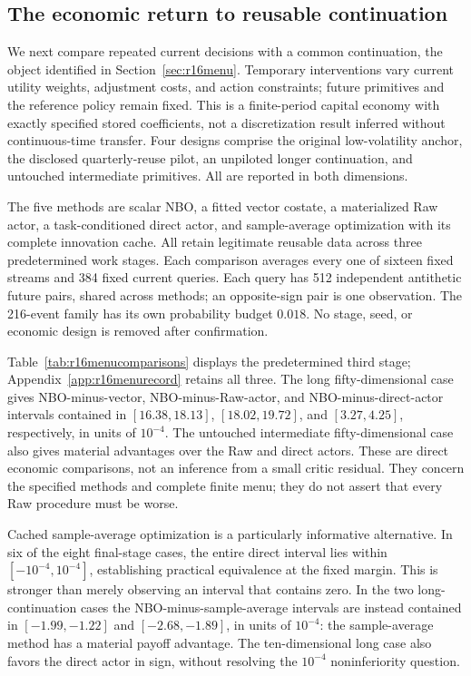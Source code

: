 \subsection{The economic return to reusable continuation}
\label{sec:r16completedmenu}
We next compare repeated current decisions with a common continuation, the object identified in Section~\ref{sec:r16menu}. Temporary interventions vary current utility weights, adjustment costs, and action constraints; future primitives and the reference policy remain fixed. This is a finite-period capital economy with exactly specified stored coefficients, not a discretization result inferred without continuous-time transfer. Four designs comprise the original low-volatility anchor, the disclosed quarterly-reuse pilot, an unpiloted longer continuation, and untouched intermediate primitives. All are reported in both dimensions.

The five methods are scalar NBO, a fitted vector costate, a materialized Raw actor, a task-conditioned direct actor, and sample-average optimization with its complete innovation cache. All retain legitimate reusable data across three predetermined work stages. Each comparison averages every one of sixteen fixed streams and 384 fixed current queries. Each query has 512 independent antithetic future pairs, shared across methods; an opposite-sign pair is one observation. The 216-event family has its own probability budget $0.018$. No stage, seed, or economic design is removed after confirmation.



Table~\ref{tab:r16menucomparisons} displays the predetermined third stage; Appendix~\ref{app:r16menurecord} retains all three. The long fifty-dimensional case gives NBO-minus-vector, NBO-minus-Raw-actor, and NBO-minus-direct-actor intervals contained in $[16.38,18.13]$, $[18.02,19.72]$, and $[3.27,4.25]$, respectively, in units of $10^{-4}$. The untouched intermediate fifty-dimensional case also gives material advantages over the Raw and direct actors. These are direct economic comparisons, not an inference from a small critic residual. They concern the specified methods and complete finite menu; they do not assert that every Raw procedure must be worse.

Cached sample-average optimization is a particularly informative alternative. In six of the eight final-stage cases, the entire direct interval lies within $[-10^{-4},10^{-4}]$, establishing practical equivalence at the fixed margin. This is stronger than merely observing an interval that contains zero. In the two long-continuation cases the NBO-minus-sample-average intervals are instead contained in $[-1.99,-1.22]$ and $[-2.68,-1.89]$, in units of $10^{-4}$: the sample-average method has a material payoff advantage. The ten-dimensional long case also favors the direct actor in sign, without resolving the $10^{-4}$ noninferiority question.

